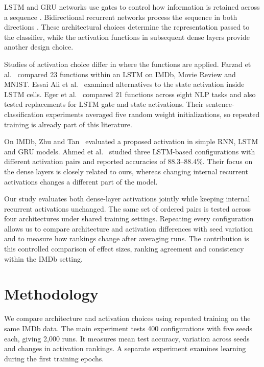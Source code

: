 \documentclass[conference,a4paper]{IEEEtran}
\begin{document}
LSTM and GRU networks use gates to control how information
is retained across a sequence
\cite{hochreiter1997,cho2014,chung2014}. Bidirectional
recurrent networks process the sequence in both directions
\cite{schuster1997}. These architectural choices determine
the representation passed to the classifier, while the
activation functions in subsequent dense layers provide
another design choice.

Studies of activation choice differ in where the functions
are applied. Farzad et al.~\cite{farzad2019} compared
23 functions within an LSTM on IMDb, Movie Review and MNIST.
Essai Ali et al.~\cite{essaiAli2022} examined alternatives
to the state activation inside LSTM cells. Eger et
al.~\cite{eger2018} compared 21 functions across eight NLP
tasks and also tested replacements for LSTM gate and state
activations. Their sentence-classification experiments
averaged five random weight initializations, so repeated
training is already part of this literature.

On IMDb, Zhu and Tan~\cite{zhu2022} evaluated a proposed
activation in simple RNN, LSTM and GRU models. Ahmed et
al.~\cite{ahmed2025} studied three LSTM-based configurations
with different activation pairs and reported accuracies of
88.3--88.4\%. Their focus on the dense layers is closely
related to ours, whereas changing internal recurrent
activations changes a different part of the model.

Our study evaluates both dense-layer activations jointly
while keeping internal recurrent activations unchanged.
The same set of ordered pairs is tested across four
architectures under shared training settings. Repeating every
configuration allows us to compare architecture and activation
differences with seed variation and to measure how rankings
change after averaging runs. The contribution is this
controlled comparison of effect sizes, ranking agreement and
consistency within the IMDb setting.

\FloatBarrier

\section{Methodology}

We compare architecture and activation choices using repeated
training on the same IMDb data. The main experiment tests
400 configurations with five seeds each, giving 2{,}000 runs.
It measures mean test accuracy, variation across seeds and
changes in activation rankings. A separate experiment examines
learning during the first training epochs.
\end{document}
